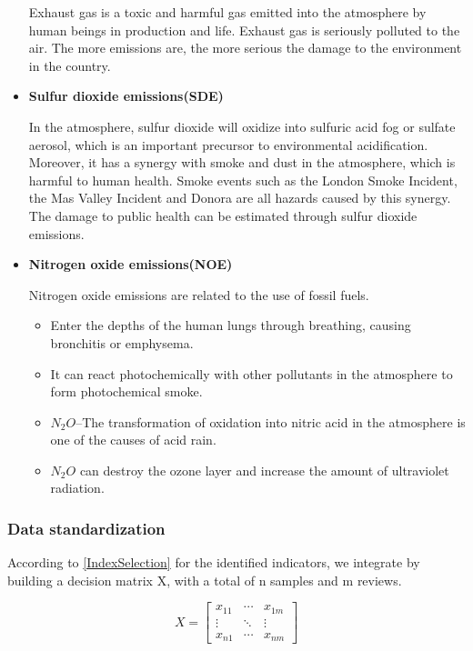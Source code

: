 \documentclass[12pt]{article}
\begin{document}
\begin{itemize}
		Exhaust gas is a toxic and harmful gas emitted into the atmosphere by human beings in production and life.
		Exhaust gas is seriously polluted to the air.
		The more emissions are, the more serious the damage to the environment in the country.
		
		\item \textbf{Sulfur dioxide emissions(SDE)}
		
		In the atmosphere, sulfur dioxide will oxidize into sulfuric acid fog or sulfate aerosol, which is an important precursor to environmental acidification.
		Moreover, it has a synergy with smoke and dust in the atmosphere, which is harmful to human health.
		Smoke events such as the London Smoke Incident, the Mas Valley Incident and Donora are all hazards caused by this synergy.
		The damage to public health can be estimated through sulfur dioxide emissions.
		
		\item \textbf{Nitrogen oxide emissions(NOE)}
		
		Nitrogen oxide emissions are related to the use of fossil fuels.
		
		\begin{itemize}
			\item Enter the depths of the human lungs through breathing, causing bronchitis or emphysema.
			\item It can react photochemically with other pollutants in the atmosphere to form photochemical smoke.
			\item $N_{2}O$--The transformation of oxidation into nitric acid in the atmosphere is one of the causes of acid rain.
			\item $N_{2}O$ can destroy the ozone layer and increase the amount of ultraviolet radiation.
		\end{itemize}
	\end{itemize}
	
	\subsubsection{Data standardization} %
	According to \ref{IndexSelection} for the identified indicators, we integrate by building a decision matrix X, with a total of n samples and m reviews.
	
	\begin{equation}\label{mat:decision}
		X=
		\begin{bmatrix}
			x_{11} & \cdots  & x_{1m}\\
			\vdots  & \ddots & \vdots \\
			x_{n1} & \cdots & x_{nm}
		\end{bmatrix}
	\end{equation}
\end{document}
